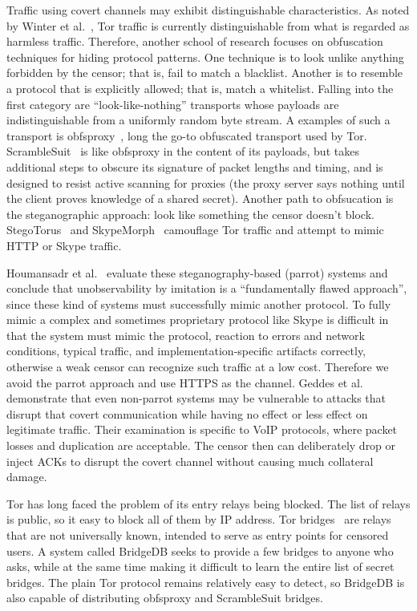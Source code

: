 \documentclass{article}
\begin{document}
Traffic using covert channels may exhibit distinguishable characteristics. As
noted by Winter et al.~\cite{foci12-winter}, Tor traffic is currently
distinguishable from what is regarded as harmless traffic. Therefore, another
school of research focuses on obfuscation techniques for hiding protocol
patterns. One technique is to look unlike anything forbidden by the censor; that
is, fail to match a blacklist. Another is to resemble a protocol that is
explicitly allowed; that is, match a whitelist. Falling into the first category
are ``look-like-nothing'' transports whose payloads are indistinguishable from a
uniformly random byte stream. A examples of such a transport is
obfsproxy~\cite{obfsproxy}, long the go-to obfuscated transport used by Tor.
ScrambleSuit~\cite{scramblesuit} is like obfsproxy in the content of its
payloads, but takes additional steps to obscure its signature of packet lengths
and timing, and is designed to resist active scanning for proxies (the proxy
server says nothing until the client proves knowledge of a shared secret).
Another path to obfsucation is the steganographic approach: look like something
the censor doesn't block. StegoTorus~\cite{stegotorus} and SkypeMorph~\cite{skypemorph} camouflage Tor
traffic and attempt to mimic HTTP or Skype traffic.

Houmansadr et al.~\cite{parrot} evaluate these steganography-based (parrot)
systems and conclude that unobservability by imitation is a ``fundamentally
flawed approach'', since these kind of systems must successfully mimic another
protocol. To fully mimic a complex and sometimes proprietary protocol like Skype
is difficult in that the system must mimic the protocol,  reaction to errors and
network conditions, typical traffic, and implementation-specific artifacts
correctly, otherwise a weak censor can recognize such traffic at a low cost.
Therefore we avoid the parrot approach and use HTTPS as the channel. Geddes  et
al.~\cite{acks} demonstrate that even non-parrot systems may be vulnerable to
attacks that disrupt that covert communication while having no effect or less
effect on legitimate traffic. Their examination is specific to VoIP protocols,
where packet losses and duplication are acceptable. The censor then can
deliberately drop or inject ACKs to disrupt the covert channel without causing
much collateral damage.

Tor has long faced the problem of its entry relays being blocked. The list of
relays is public, so it easy to block all of them by IP address. Tor
bridges~\cite{tor-blocking} are relays that are not universally known, intended
to serve as entry points for censored users. A system called BridgeDB seeks to
provide a few bridges to anyone who asks, while at the same time making it
difficult to learn the entire list of secret bridges. The plain Tor protocol
remains relatively easy to detect, so BridgeDB is also capable of distributing
obfsproxy and ScrambleSuit bridges.
\end{document}
